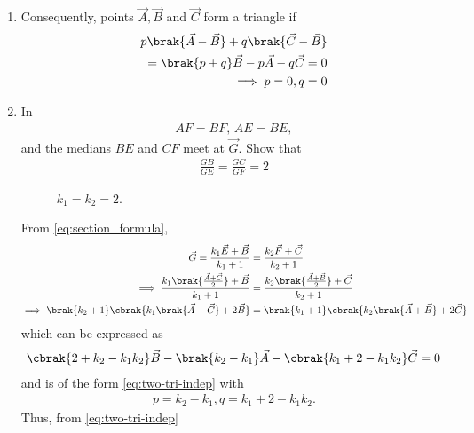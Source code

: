 \begin{enumerate}[label=\thesection.\arabic*.,ref=\thesection.\theenumi]
  \item Consequently, points $\vec{A},\vec{B}$ and $\vec{C}$ form a triangle  if 
	  \label{prop:two-tri-indep}
  \begin{align}
	  p\brak{\vec{A}- \vec{B}} +q\brak{\vec{C} -\vec{B}} 
	  \\
	  =\brak{p+q}\vec{B}- p\vec{A} -q\vec{C} = 0
	  \\
	  \implies p=0, q=0
	  \label{eq:two-tri-indep}
  \end{align}
  \item In 
	\begin{align}
	AF = BF, \,
	AE = BE, 
	\end{align}
	and the medians $BE$ and $CF$ meet at $\vec{G}$.
	Show that 
	\begin{align}
\label{eq:tri_med_centroid_ratio}
	\frac{GB}{GE} = \frac{GC}{GF} = 2
	\end{align}
%
\begin{figure}[!ht]
	\begin{center}
		\resizebox{\columnwidth}{!}{}
	\end{center}
	\caption{$k_1=k_2=2$.}
	\label{fig:tri_med_isect}	
\end{figure}
\solution From 
	  \eqref{eq:section_formula},
  \begin{align}
	  \label{eq:section_formula-G}
\vec{G} = 
	   \frac{k_1\vec{E}+ \vec{B}}{k_1+1}
	  &= \frac{k_2\vec{F}+ \vec{C}}{k_2+1}
	  \\
	  \implies 
	   \frac{k_1\brak{\frac{\vec{A}+\vec{C}}{2}}+ \vec{B}}{k_1+1}
	  &= \frac{k_2\brak{\frac{\vec{A}+\vec{B}}{2}}+ \vec{C}}{k_2+1}
	  \\
	  \implies 
	\brak{k_2+1}   \cbrak{k_1\brak{{\vec{A}+\vec{C}}}+ 2\vec{B}}
	  &= \brak{k_1+1}\cbrak{k_2\brak{{\vec{A}+\vec{B}}}+ 2\vec{C}}
  \end{align}
  which can be expressed as
  \begin{align}
	  \cbrak{2 + k_2- k_1k_2 }\vec{B}-\brak{k_2-k_1}\vec{A}  - \cbrak{k_1 +2 - k_1k_2}\vec{C}
	  =0
  \end{align}
  and is of the form
	  \eqref{eq:two-tri-indep}
	  with 
  \begin{align}
	  p = {k_2-k_1}, q = {k_1 +2 - k_1k_2}.
  \end{align}
  Thus, from 
	  \eqref{eq:two-tri-indep}
  \begin{align}

\end{align}
\end{enumerate}
